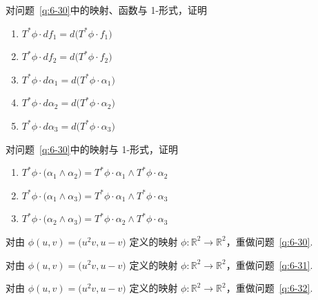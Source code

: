 \begin{question}\label{q:6-31}
对问题~\ref{q:6-30}中的映射、函数与 1-形式，证明
\begin{enumerate}
  \item[(a)] $T^*\phi\cdot df_1=d\bigl(T^*\phi\cdot f_1\bigr)$
  \item[(b)] $T^*\phi\cdot df_2=d\bigl(T^*\phi\cdot f_2\bigr)$
  \item[(c)] $T^*\phi\cdot d\alpha_1=d\bigl(T^*\phi\cdot\alpha_1\bigr)$
  \item[(d)] $T^*\phi\cdot d\alpha_2=d\bigl(T^*\phi\cdot\alpha_2\bigr)$
  \item[(e)] $T^*\phi\cdot d\alpha_3=d\bigl(T^*\phi\cdot\alpha_3\bigr)$
\end{enumerate}
\end{question}

\begin{question}\label{q:6-32}
对问题~\ref{q:6-30}中的映射与 1-形式，证明
\begin{enumerate}
  \item[(a)] $T^*\phi\cdot\bigl(\alpha_1\wedge\alpha_2\bigr)=T^*\phi\cdot\alpha_1\wedge T^*\phi\cdot\alpha_2$
  \item[(b)] $T^*\phi\cdot\bigl(\alpha_1\wedge\alpha_3\bigr)=T^*\phi\cdot\alpha_1\wedge T^*\phi\cdot\alpha_3$
  \item[(c)] $T^*\phi\cdot\bigl(\alpha_2\wedge\alpha_3\bigr)=T^*\phi\cdot\alpha_2\wedge T^*\phi\cdot\alpha_3$
\end{enumerate}
\end{question}

\begin{question}\label{q:6-33}
对由 $\phi(u,v)=\bigl(u^2v,u-v\bigr)$ 定义的映射 $\phi:\mathbb{R}^2\to\mathbb{R}^2$，重做问题~\ref{q:6-30}.
\end{question}

\begin{question}\label{q:6-34}
对由 $\phi(u,v)=\bigl(u^2v,u-v\bigr)$ 定义的映射 $\phi:\mathbb{R}^2\to\mathbb{R}^2$，重做问题~\ref{q:6-31}.
\end{question}

\begin{question}\label{q:6-35}
对由 $\phi(u,v)=\bigl(u^2v,u-v\bigr)$ 定义的映射 $\phi:\mathbb{R}^2\to\mathbb{R}^2$，重做问题~\ref{q:6-32}.
\end{question}


